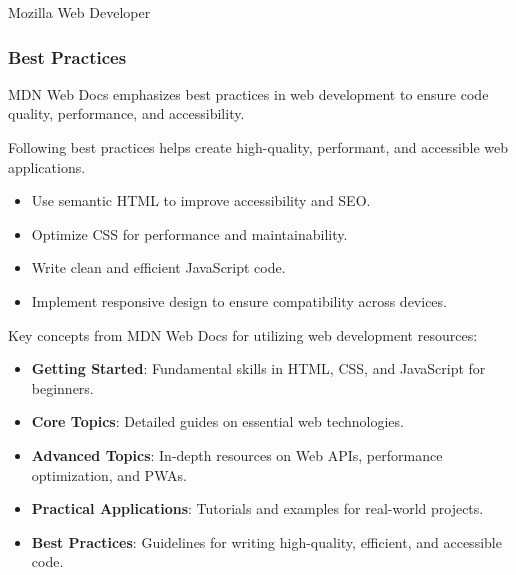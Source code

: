 \begin{notes}{Mozilla Web Developer}
\begin{highlight}
    \end{highlight}
    
    \subsubsection*{Best Practices}
    
    MDN Web Docs emphasizes best practices in web development to ensure code quality, performance, and accessibility.
    
    \begin{highlight}
    
        Following best practices helps create high-quality, performant, and accessible web applications.
        
        \begin{itemize}
            \item Use semantic HTML to improve accessibility and SEO.
            \item Optimize CSS for performance and maintainability.
            \item Write clean and efficient JavaScript code.
            \item Implement responsive design to ensure compatibility across devices.
        \end{itemize}
    
    \end{highlight}
    
    \begin{highlight}
    
        Key concepts from MDN Web Docs for utilizing web development resources:
        
        \begin{itemize}
            \item \textbf{Getting Started}: Fundamental skills in HTML, CSS, and JavaScript for beginners.
            \item \textbf{Core Topics}: Detailed guides on essential web technologies.
            \item \textbf{Advanced Topics}: In-depth resources on Web APIs, performance optimization, and PWAs.
            \item \textbf{Practical Applications}: Tutorials and examples for real-world projects.
            \item \textbf{Best Practices}: Guidelines for writing high-quality, efficient, and accessible code.
        \end{itemize}
        
    \end{highlight}
\end{notes}

